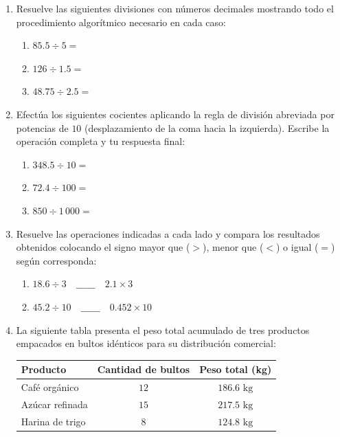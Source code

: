 \documentclass[12pt, letterpaper]{article}
\begin{document}
	\begin{enumerate}[itemsep=0.8cm]
		
		\item Resuelve las siguientes divisiones con números decimales mostrando todo el procedimiento algorítmico necesario en cada caso:
		\begin{enumerate}[label=\alph*., itemsep=0.3cm, topsep=0.2cm]
			\item $85.5 \div 5 =$
			\item $126 \div 1.5 =$
			\item $48.75 \div 2.5 =$
		\end{enumerate}
		
		\item Efectúa los siguientes cocientes aplicando la regla de división abreviada por potencias de $10$ (desplazamiento de la coma hacia la izquierda). Escribe la operación completa y tu respuesta final:
		\begin{enumerate}[label=\alph*., itemsep=0.3cm, topsep=0.2cm]
			\item $348.5 \div 10 =$
			\item $72.4 \div 100 =$
			\item $850 \div 1\,000 =$
		\end{enumerate}
		
		\item Resuelve las operaciones indicadas a cada lado y compara los resultados obtenidos colocando el signo mayor que ($>$), menor que ($<$) o igual ($=$) según corresponda:
		\begin{enumerate}[label=\alph*., itemsep=0.3cm, topsep=0.2cm]
			\item $18.6 \div 3 \quad \_\_\_\_\_\_ \quad 2.1 \times 3$
			\item $45.2 \div 10 \quad \_\_\_\_\_\_ \quad 0.452 \times 10$
		\end{enumerate}
		
		\item La siguiente tabla presenta el peso total acumulado de tres productos empacados en bultos idénticos para su distribución comercial:
		
		\begin{table}[h]
			\centering
			\begin{tabular}{lcc}
				\toprule
				\textbf{Producto} & \textbf{Cantidad de bultos} & \textbf{Peso total (kg)} \\
				\midrule
				Café orgánico & $12$ & $186.6\text{ kg}$ \\
				Azúcar refinada & $15$ & $217.5\text{ kg}$ \\
				Harina de trigo & $8$ & $124.8\text{ kg}$ \\
				\bottomrule
			\end{tabular}
		\end{table}
		

\end{enumerate}
\end{document}
